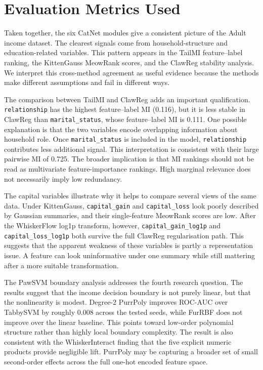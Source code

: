 \documentclass[11pt]{article}
\begin{document}
\section{Evaluation Metrics Used}
\label{sec:evaluation}

Taken together, the six CatNet modules give a consistent picture of the Adult income dataset. The clearest signals come from household-structure and education-related variables. This pattern appears in the TailMI feature--label ranking, the KittenGauss MeowRank scores, and the ClawReg stability analysis. We interpret this cross-method agreement as useful evidence because the methods make different assumptions and fail in different ways.

The comparison between TailMI and ClawReg adds an important qualification. \texttt{relationship} has the highest feature--label MI (0.116), but it is less stable in ClawReg than \texttt{marital\_status}, whose feature--label MI is 0.111. One possible explanation is that the two variables encode overlapping information about household role. Once \texttt{marital\_status} is included in the model, \texttt{relationship} contributes less additional signal. This interpretation is consistent with their large pairwise MI of 0.725. The broader implication is that MI rankings should not be read as multivariate feature-importance rankings. High marginal relevance does not necessarily imply low redundancy.

The capital variables illustrate why it helps to compare several views of the same data. Under KittenGauss, \texttt{capital\_gain} and \texttt{capital\_loss} look poorly described by Gaussian summaries, and their single-feature MeowRank scores are low. After the WhiskerFlow log1p transform, however, \texttt{capital\_gain\_log1p} and \texttt{capital\_loss\_log1p} both survive the full ClawReg regularisation path. This suggests that the apparent weakness of these variables is partly a representation issue. A feature can look uninformative under one summary while still mattering after a more suitable transformation.

The PawSVM boundary analysis addresses the fourth research question. The results suggest that the income decision boundary is not purely linear, but that the nonlinearity is modest. Degree-2 PurrPoly improves ROC-AUC over TabbySVM by roughly 0.008 across the tested seeds, while FurRBF does not improve over the linear baseline. This points toward low-order polynomial structure rather than highly local boundary complexity. The result is also consistent with the WhiskerInteract finding that the five explicit numeric products provide negligible lift. PurrPoly may be capturing a broader set of small second-order effects across the full one-hot encoded feature space.
\end{document}
